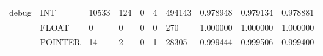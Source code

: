 \begin{table}[t]
\begin{tabular}{lp{2.0cm}p{2.0cm}p{2.0cm}p{2.0cm}p{2.0cm}p{2.0cm}p{2.0cm}p{2.0cm}p{2.0cm}}
\cline{1-10}
\multirow{3}{*}{debug} & INT &                              10533 &                               124 &                                0 &                                 4 &                          494143 &                        0.978948 &                               0.979134 &                             0.978881 \\
      & FLOAT &                                  0 &                                 0 &                                0 &                                 0 &                             270 &                        1.000000 &                               1.000000 &                             1.000000 \\
      & POINTER &                                 14 &                                 2 &                                0 &                                 1 &                           28305 &                        0.999444 &                               0.999506 &                             0.999400 \\
\bottomrule
\end{tabular}
\end{table}
